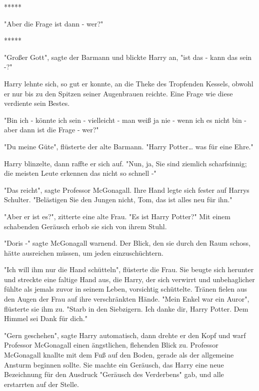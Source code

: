 

\hypertarget{die-realituxe4t-mit-ihren-alternativen-vergleichen}{%

*****

"Aber die Frage ist dann - wer?" ~

*****

"Großer Gott", sagte der Barmann und blickte Harry an, "ist das - kann das sein -?"

Harry lehnte sich, so gut er konnte, an die Theke des Tropfenden Kessels, obwohl er nur bis zu den Spitzen seiner Augenbrauen reichte. Eine Frage wie diese verdiente sein Bestes.

"Bin ich - könnte ich sein - vielleicht - man weiß ja nie - wenn ich es nicht bin - aber dann ist die Frage - wer?"

"Du meine Güte", flüsterte der alte Barmann. "Harry Potter… was für eine Ehre."

Harry blinzelte, dann raffte er sich auf. "Nun, ja, Sie sind ziemlich scharfsinnig; die meisten Leute erkennen das nicht so schnell -"

"Das reicht", sagte Professor McGonagall. Ihre Hand legte sich fester auf Harrys Schulter. "Belästigen Sie den Jungen nicht, Tom, das ist alles neu für ihn."

"Aber er ist es?", zitterte eine alte Frau. "Es ist Harry Potter?" Mit einem schabenden Geräusch erhob sie sich von ihrem Stuhl.

"Doris -" sagte McGonagall warnend. Der Blick, den sie durch den Raum schoss, hätte ausreichen müssen, um jeden einzuschüchtern.

"Ich will ihm nur die Hand schütteln", flüsterte die Frau. Sie beugte sich herunter und streckte eine faltige Hand aus, die Harry, der sich verwirrt und unbehaglicher fühlte als jemals zuvor in seinem Leben, vorsichtig schüttelte. Tränen fielen aus den Augen der Frau auf ihre verschränkten Hände. "Mein Enkel war ein Auror", flüsterte sie ihm zu. "Starb in den Siebzigern. Ich danke dir, Harry Potter. Dem Himmel sei Dank für dich."

"Gern geschehen", sagte Harry automatisch, dann drehte er den Kopf und warf Professor McGonagall einen ängstlichen, flehenden Blick zu. Professor McGonagall knallte mit dem Fuß auf den Boden, gerade als der allgemeine Ansturm beginnen sollte. Sie machte ein Geräusch, das Harry eine neue Bezeichnung für den Ausdruck "Geräusch des Verderbens" gab, und alle erstarrten auf der Stelle.

}
